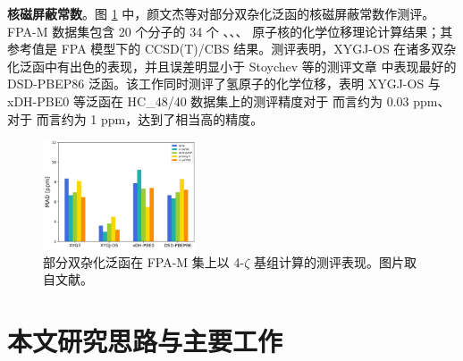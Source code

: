 \begin{table}[h]
\centering
\caption{部分泛函在 F38 测试集下谐振频率计算的测评表现。误差单位为波数 ($\text{cm}^{-1}$)。数据取自文献\cite{Gu-Xu.JCTC.2021}。}
\label{tab.1.xdh-freq-bench}
\end{table}

\textbf{核磁屏蔽常数}。图 \ref{fig.1.xdh-nmr} 中，颜文杰等对部分双杂化泛函的核磁屏蔽常数作测评\cite{Yan-Xu.JCTC.2022}。FPA-M 数据集包含 20 个分子的 34 个 、、、 原子核的化学位移理论计算结果；其参考值是 FPA 模型下的 CCSD(T)/CBS 结果。测评表明，XYGJ-OS 在诸多双杂化泛函中有出色的表现，并且误差明显小于 Stoychev 等的测评文章\cite{Stoychev-Neese.JCTC.2018} 中表现最好的 DSD-PBEP86 泛函。该工作同时测评了氢原子的化学位移，表明 XYGJ-OS 与 xDH-PBE0 等泛函在 HC\_48/40 数据集上的测评精度对于  而言约为 0.03 ppm、对于  而言约为 1 ppm，达到了相当高的精度。

\begin{figure}[h]
  \centering
  \includegraphics[width=0.4\textwidth]{assets/xdh-nmr.jpeg}
  \caption{部分双杂化泛函在 FPA-M 集上以 4-$\zeta$ 基组计算的测评表现。图片取自文献\cite{Yan-Xu.JCTC.2022}。}
  \label{fig.1.xdh-nmr}
\end{figure}

\section{本文研究思路与主要工作}

